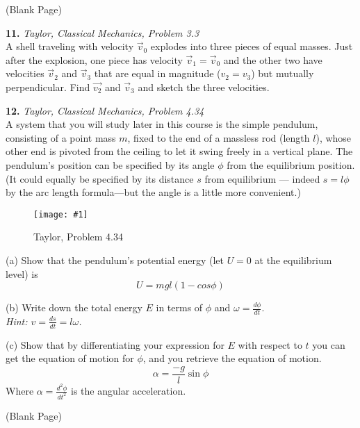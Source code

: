 \documentclass[11pt]{article}
\newcommand{\fig}[4]{
    \begin{figure}[H]
        \centering
        \texttt{[image: \#1]}
        \caption{#2}
        \label{exp4fit}
    \end{figure}
}
\theoremstyle{gangnamstyle}{\newtheorem{definition}{Definition}[]}
\theoremstyle{gangnamstyle}{\newtheorem{example}{Example}[]}
\theoremstyle{gangnamstyle}{\newtheorem{problem}{Problem}[]}
\begin{document}
\pagebreak

\begin{center}
(Blank Page)
\end{center}

\pagebreak

\textbf{11.} \textit{Taylor, Classical Mechanics, Problem 3.3} \\
A shell traveling with velocity $\Vec{v}_0$ explodes into three pieces of equal masses. Just after the explosion, one piece has velocity $\Vec{v}_1 = \Vec{v}_0$ and the other two have velocities $\Vec{v}_2$ and $\Vec{v}_3$ that are equal in magnitude ($v_2 = v_3$) but mutually perpendicular. Find $\Vec{v_2}$ and $\Vec{v}_3$ and sketch the three velocities. 

\pagebreak

\textbf{12.} \textit{Taylor, Classical Mechanics, Problem 4.34} \\
A system that you will study later in this course is the simple pendulum, consisting of a point mass $m$, fixed to the end of a massless rod (length $l$), whose other end is pivoted from the ceiling to let it swing freely in a vertical plane. The pendulum's position can be specified by its angle $\phi$ from the equilibrium position. (It could equally be specified by its distance $s$ from equilibrium —
indeed $s = l\phi$ by the arc length formula—but the angle is a little more convenient.) 
\fig{figs/0716/t434.png}{Taylor, Problem 4.34}{0.65}{0}

(a) Show that the pendulum's potential energy (let $U = 0$ at the equilibrium level) is 
\[ U = mgl(1 - cos\phi) \]

(b) Write down the total energy $E$ in terms of $\phi$ and $\omega = \frac{d\phi}{dt}$. \\
\textit{Hint: $v = \frac{ds}{dt} = l\omega$.}

(c) Show that by differentiating your expression for $E$ with respect to $t$ you can get the equation of motion for $\phi$, and you retrieve the equation of motion. 
\[ \alpha = \frac{-g}{l}\sin\phi \]
Where $\alpha = \frac{d^2\phi}{dt^2}$ is the angular acceleration. 

\pagebreak

\begin{center}
(Blank Page)
\end{center}
\end{document}
